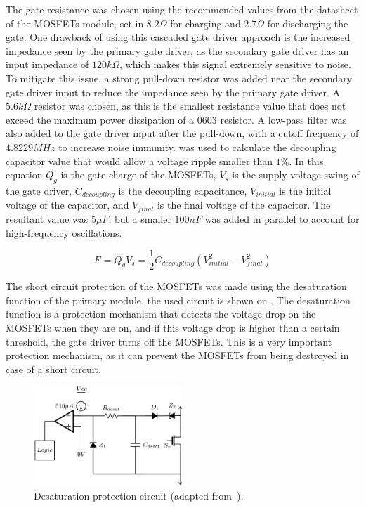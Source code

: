 The gate resistance was chosen using the recommended values from the datasheet of the MOSFETs module, set in $8.2\Omega$ for charging and $2.7\Omega$ for discharging the gate. One drawback of using this cascaded gate driver approach is the increased impedance seen by the primary gate driver, as the secondary gate driver has an input impedance of $120k\Omega$, which makes this signal extremely sensitive to noise. To mitigate this issue, a strong pull-down resistor was added near the secondary gate driver input to reduce the impedance seen by the primary gate driver. A $5.6k\Omega$ resistor was chosen, as this is the smallest resistance value that does not exceed the maximum power dissipation of a 0603 resistor. A low-pass filter was also added to the gate driver input after the pull-down, with a cutoff frequency of $4.8229MHz$ to increase noise immunity.  was used to calculate the decoupling capacitor value that would allow a voltage ripple smaller than $1\%$. In this equation $Q_g$ is the gate charge of the MOSFETs, $V_s$ is the supply voltage swing of the gate driver, $C_{decoupling}$ is the decoupling capacitance, $V_{initial}$ is the initial voltage of the capacitor, and $V_{final}$ is the final voltage of the capacitor. The resultant value was $5\mu F$, but a smaller $100nF$ was added in parallel to account for high-frequency oscillations.

\begin {equation}
	E = Q_g V_s = \frac{1}{2} C_{decoupling} (V_{initial}^2 - V_{final}^2)
	\label{eq:gate_energy_vs_capacitor}
\end{equation}

The short circuit protection of the MOSFETs was made using the desaturation function of the primary module, the used circuit is shown on . The desaturation function is a protection mechanism that detects the voltage drop on the MOSFETs when they are on, and if this voltage drop is higher than a certain threshold, the gate driver turns off the MOSFETs. This is a very important protection mechanism, as it can prevent the MOSFETs from being destroyed in case of a short circuit.

\begin{figure}[H]
	\centering
	\includegraphics[width=0.5\textwidth]{Figures/desat_circuit.png}
	\caption{Desaturation protection circuit (adapted from~\cite{Costa:MSc}).}
	\label{fig:desat_circuit}
\end{figure}

